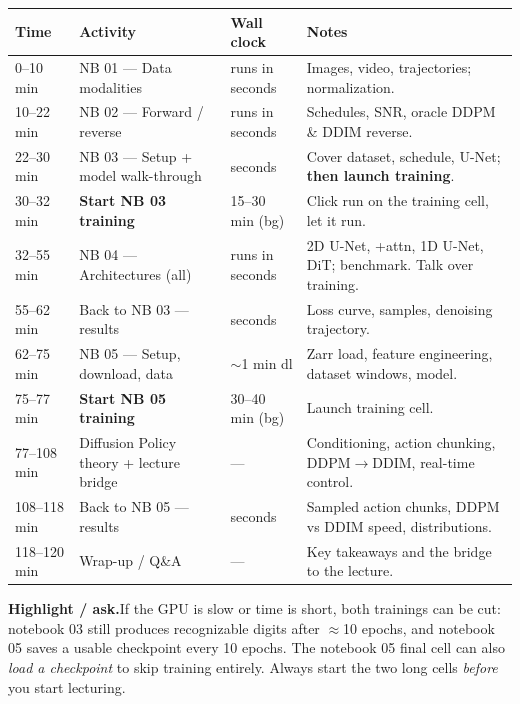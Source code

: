 \documentclass[11pt]{article}
\newcommand{\highlight}[1]{\par\smallskip\noindent\textcolor{hlcolor}{\textbf{Highlight / ask.}}\hspace{0.4em}#1\par\smallskip}
\begin{document}
\begin{center}
\begin{longtable}{@{}p{2.0cm} p{4.6cm} p{2.0cm} p{6.0cm}@{}}
\toprule
\textbf{Time} & \textbf{Activity} & \textbf{Wall clock} & \textbf{Notes} \\
\midrule
\endhead
0--10 min   & NB 01 --- Data modalities          & runs in seconds & Images, video, trajectories; normalization. \\
10--22 min  & NB 02 --- Forward / reverse        & runs in seconds & Schedules, SNR, oracle DDPM \& DDIM reverse. \\
22--30 min  & NB 03 --- Setup + model walk-through & seconds        & Cover dataset, schedule, U-Net; \textbf{then launch training}. \\
30--32 min  & \textbf{Start NB 03 training}      & 15--30 min (bg) & Click run on the training cell, let it run. \\
32--55 min  & NB 04 --- Architectures (all)      & runs in seconds & 2D U-Net, +attn, 1D U-Net, DiT; benchmark. Talk over training. \\
55--62 min  & Back to NB 03 --- results          & seconds         & Loss curve, samples, denoising trajectory. \\
62--75 min  & NB 05 --- Setup, download, data    & $\sim$1 min dl  & Zarr load, feature engineering, dataset windows, model. \\
75--77 min  & \textbf{Start NB 05 training}      & 30--40 min (bg) & Launch training cell. \\
77--108 min & Diffusion Policy theory + lecture bridge & ---       & Conditioning, action chunking, DDPM$\to$DDIM, real-time control. \\
108--118 min& Back to NB 05 --- results          & seconds         & Sampled action chunks, DDPM vs DDIM speed, distributions. \\
118--120 min& Wrap-up / Q\&A                     & ---             & Key takeaways and the bridge to the lecture. \\
\bottomrule
\end{longtable}
\end{center}

\highlight{If the GPU is slow or time is short, both trainings can be cut: notebook 03 still
produces recognizable digits after $\approx$10 epochs, and notebook 05 saves a usable checkpoint
every 10 epochs. The notebook 05 final cell can also \emph{load a checkpoint} to skip training
entirely. Always start the two long cells \emph{before} you start lecturing.}
\end{document}
